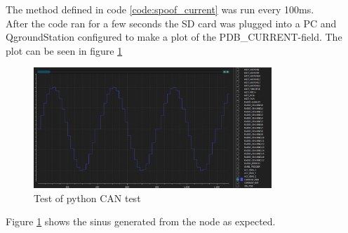 The method defined in code \ref{code:spoof_current} was run every 100ms.\\
After the code ran for a few seconds the SD card was plugged into a PC and QgroundStation configured to make a plot of the PDB\_CURRENT-field. The plot can be seen in figure \ref{fig:pdb_current_log} 


\begin{figure}[H]
    \center
    \includegraphics[width=0.8\textwidth]{graphics/test_can_spoof_current.png}
    \caption{Test of python CAN test}
    \label{fig:pdb_current_log}
\end{figure}

Figure \ref{fig:pdb_current_log} shows the sinus generated from the node as expected.

